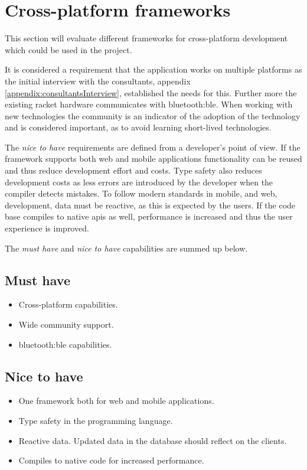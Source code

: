 \section{Cross-platform frameworks}
\label{sec:crossplatform}

This section will evaluate different frameworks for cross-platform development which could be used in the project.

It is considered a requirement that the application works on multiple platforms as the initial interview with the consultants, appendix \ref{appendix:consultantsInterview}, established the needs for this. Further more the existing racket hardware communicates with \gls{bluetooth:ble}.
When working with new technologies the community is an indicator of the adoption of the technology and is considered important, as to avoid learning short-lived technologies.

The \textit{nice to have} requirements are defined from a developer's point of view.
If the framework supports both web and mobile applications functionality can be reused and thus reduce development effort and costs.
Type safety also reduces development costs as less errors are introduced by the developer when the compiler detects mistakes.
To follow modern standards in mobile, and web, development, data must be reactive, as this is expected by the users.
If the code base compiles to native \glspl{api} as well, performance is increased and thus the user experience is improved.

The \textit{must have} and \textit{nice to have} capabilities are summed up below.

\subsection*{Must have}
\begin{itemize}
	\item Cross-platform capabilities.
	\item Wide community support.
	\item \gls{bluetooth:ble} capabilities.
\end{itemize}

\subsection*{Nice to have}
\begin{itemize}
	\item One framework both for web and mobile applications.
	\item Type safety in the programming language.
	\item Reactive data. Updated data in the database should reflect on the clients.
	\item Compiles to native code for increased performance.
\end{itemize}

